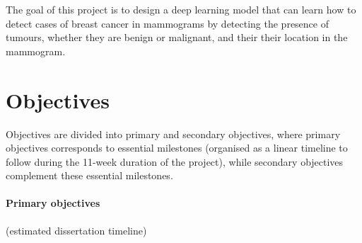 \documentclass[letterpaper,12pt]{article}
\begin{document}
The goal of this project is to design a deep learning model that can learn how to detect cases of breast cancer in mammograms by detecting the presence of tumours, whether they are benign or malignant, and their their location in the mammogram.


\section{Objectives}
\label{sec:objectives}

Objectives are divided into primary and secondary objectives, where primary objectives corresponds to essential milestones (organised as a linear timeline to follow during the 11-week duration of the project), while secondary objectives complement these essential milestones.

\paragraph{Primary objectives}  (estimated dissertation timeline)
\end{document}

